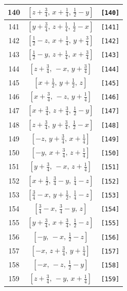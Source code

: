 \documentclass[fleqn,8pt]{jsarticle}
\begin{document}
\begin{longtable}{ccc}
140 & $\left[ z + \frac{3}{4},\, x + \frac{1}{4},\, \frac{1}{2} - y \right]$ & {\tt [140]} \\ \hline
141 & $\left[ y + \frac{3}{4},\, z + \frac{1}{4},\, \frac{1}{2} - x \right]$ & {\tt [141]} \\ \hline
142 & $\left[ \frac{1}{2} - z,\, x + \frac{1}{4},\, y + \frac{3}{4} \right]$ & {\tt [142]} \\ \hline
143 & $\left[ \frac{1}{2} - y,\, z + \frac{1}{4},\, x + \frac{3}{4} \right]$ & {\tt [143]} \\ \hline
144 & $\left[ z + \frac{3}{4},\, - x,\, y + \frac{3}{4} \right]$ & {\tt [144]} \\ \hline
145 & $\left[ x + \frac{1}{2},\, y + \frac{1}{2},\, z \right]$ & {\tt [145]} \\ \hline
146 & $\left[ x + \frac{3}{4},\, - z,\, y + \frac{1}{4} \right]$ & {\tt [146]} \\ \hline
147 & $\left[ x + \frac{3}{4},\, z + \frac{3}{4},\, \frac{1}{2} - y \right]$ & {\tt [147]} \\ \hline
148 & $\left[ z + \frac{3}{4},\, y + \frac{3}{4},\, \frac{1}{2} - x \right]$ & {\tt [148]} \\ \hline
149 & $\left[ - z,\, y + \frac{3}{4},\, x + \frac{1}{4} \right]$ & {\tt [149]} \\ \hline
150 & $\left[ - y,\, x + \frac{3}{4},\, z + \frac{1}{4} \right]$ & {\tt [150]} \\ \hline
151 & $\left[ y + \frac{3}{4},\, - x,\, z + \frac{1}{4} \right]$ & {\tt [151]} \\ \hline
152 & $\left[ x + \frac{1}{2},\, \frac{3}{4} - y,\, \frac{1}{4} - z \right]$ & {\tt [152]} \\ \hline
153 & $\left[ \frac{3}{4} - x,\, y + \frac{1}{2},\, \frac{1}{4} - z \right]$ & {\tt [153]} \\ \hline
154 & $\left[ \frac{3}{4} - x,\, \frac{3}{4} - y,\, z \right]$ & {\tt [154]} \\ \hline
155 & $\left[ y + \frac{3}{4},\, x + \frac{3}{4},\, \frac{1}{2} - z \right]$ & {\tt [155]} \\ \hline
156 & $\left[ - y,\, - x,\, \frac{1}{2} - z \right]$ & {\tt [156]} \\ \hline
157 & $\left[ - x,\, z + \frac{3}{4},\, y + \frac{1}{4} \right]$ & {\tt [157]} \\ \hline
158 & $\left[ - x,\, - z,\, \frac{1}{2} - y \right]$ & {\tt [158]} \\ \hline
159 & $\left[ z + \frac{3}{4},\, - y,\, x + \frac{1}{4} \right]$ & {\tt [159]} \\ \hline

\end{longtable}
\end{document}
